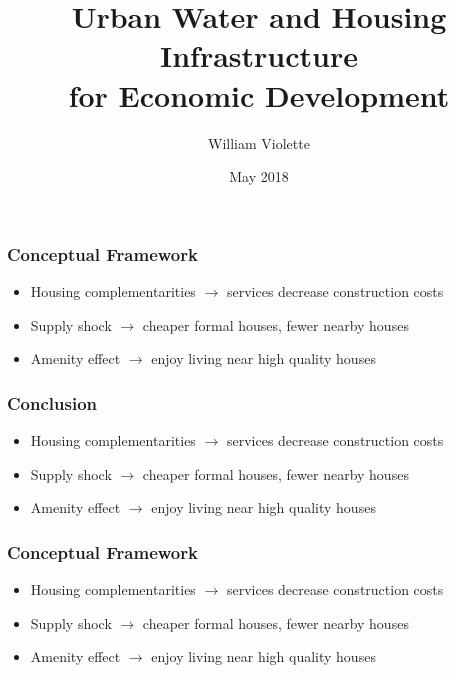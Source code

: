 \documentclass[aspectratio=149]{beamer}
\title{Urban Water and Housing Infrastructure  \\ for Economic Development} %
\author{William Violette}
\date{May 2018} %
\begin{document}
\beamertemplatenavigationsymbolsempty

\begin{frame}
\titlepage %
\end{frame}





\begin{frame}
\frametitle{Conceptual Framework}

\begin{itemize}
\item Housing complementarities $\rightarrow$ services decrease construction costs
\item Supply shock $\rightarrow$ cheaper formal houses, fewer nearby houses
\item Amenity effect $\rightarrow$ enjoy living near high quality houses
\end{itemize}

\end{frame}



\begin{frame}
\frametitle{Conclusion}

\begin{itemize}
\item Housing complementarities $\rightarrow$ services decrease construction costs
\item Supply shock $\rightarrow$ cheaper formal houses, fewer nearby houses
\item Amenity effect $\rightarrow$ enjoy living near high quality houses
\end{itemize}

\end{frame}





\begin{frame}
\frametitle{Conceptual Framework}

\begin{itemize}
\item Housing complementarities $\rightarrow$ services decrease construction costs
\item Supply shock $\rightarrow$ cheaper formal houses, fewer nearby houses
\item Amenity effect $\rightarrow$ enjoy living near high quality houses
\end{itemize}

\end{frame}
\end{document}
